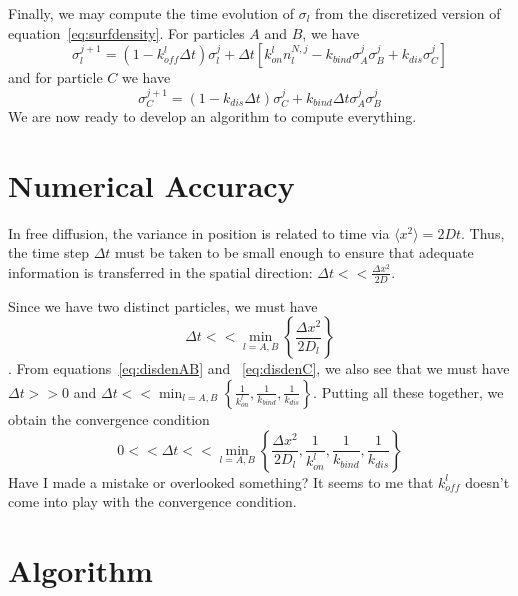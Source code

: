 \documentclass[aps, prl, preprint]{revtex4-1}
\begin{document}
Finally, we may compute the time evolution of $\sigma_l$ from the discretized version of equation~\ref{eq:surfdensity}. For particles $A$ and $B$, we have
\begin{equation}\label{eq:disdenAB}
\sigma_l^{j+1} = (1-k_{off}^l\Delta t)\sigma_l^j +\Delta t\left [k_{on}^l n_l^{N,j} -k_{bind}\sigma_A^j\sigma_B^j + k_{dis}\sigma_C^j\right ]
\end{equation}
and for particle $C$ we have
\begin{equation}\label{eq:disdenC}
\sigma_C^{j+1} = (1-k_{dis}\Delta t)\sigma_C^j + k_{bind}\Delta t\sigma_A^j\sigma_B^j
\end{equation}
We are now ready to develop an algorithm to compute everything.

\section{Numerical Accuracy}

In free diffusion, the variance in position is related to time via $\langle x^2\rangle = 2Dt$. Thus, the time step $\Delta t$ must be taken to be small enough to ensure that adequate information is transferred in the spatial direction: $\Delta t << \frac{\Delta x^2}{2D}$.

Since we have two distinct particles, we must have $$\Delta t << \min_{l=A,B}\left\lbrace\frac{\Delta x^2}{2D_l}\right\rbrace$$. From equations~\ref{eq:disdenAB} and ~\ref{eq:disdenC}, we also see that we must have $\Delta t>>0$ and $\Delta t << \min_{l=A,B}\left\lbrace\frac{1}{k_{on}^l},\frac{1}{k_{bind}}, \frac{1}{k_{dis}}\right\rbrace$. Putting all these together, we obtain the convergence condition
\begin{equation}\label{eq:conv}
0 << \Delta t << \min_{l=A,B}\left\lbrace\frac{\Delta x^2}{2D_l}, \frac{1}{k_{on}^l}, \frac{1}{k_{bind}},\frac{1}{k_{dis}}\right\rbrace
\end{equation}
\color{red}Have I made a mistake or overlooked something? It seems to me that $k_{off}^l$ doesn't come into play with the convergence condition.\normalcolor










\section{Algorithm}
\end{document}
